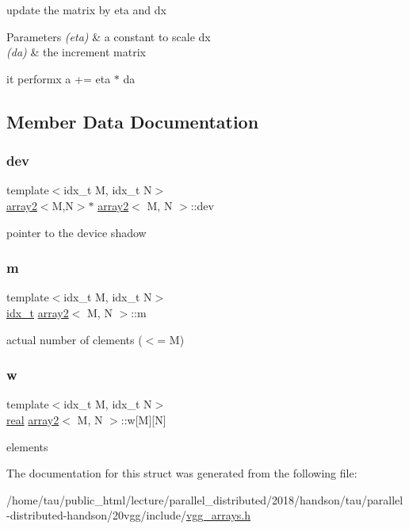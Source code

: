 update the matrix by eta and dx 


\begin{DoxyParams}{Parameters}
{\em (eta)} & a constant to scale dx \\
\hline
{\em (da)} & the increment matrix\\
\hline
\end{DoxyParams}
it performx a += eta $\ast$ da 

\subsection{Member Data Documentation}
\mbox{\label{structarray2_aedc7a89092267367178f4fcd4c9c3ead}} 
\subsubsection{\texorpdfstring{dev}{dev}}
{\footnotesize\ttfamily template$<$idx\+\_\+t M, idx\+\_\+t N$>$ \\
\hyperlink{structarray2}{array2}$<$M,N$>$$\ast$ \hyperlink{structarray2}{array2}$<$ M, N $>$\+::dev}

pointer to the device shadow \mbox{\label{structarray2_ae14313ec7a12d47e3654d69ca47391bd}} 
\subsubsection{\texorpdfstring{m}{m}}
{\footnotesize\ttfamily template$<$idx\+\_\+t M, idx\+\_\+t N$>$ \\
\hyperlink{vgg__util_8h_a8e93478a00e685bea5e6a3f617bf03a3}{idx\+\_\+t} \hyperlink{structarray2}{array2}$<$ M, N $>$\+::m}

actual number of clements ($<$= M) \mbox{\label{structarray2_aa68d1856f9eae6f8bd946367452501a6}} 
\subsubsection{\texorpdfstring{w}{w}}
{\footnotesize\ttfamily template$<$idx\+\_\+t M, idx\+\_\+t N$>$ \\
\hyperlink{vgg__util_8h_a1082d08aaa761215ec83e7149f27ad16}{real} \hyperlink{structarray2}{array2}$<$ M, N $>$\+::w\mbox{[}M\mbox{]}\mbox{[}N\mbox{]}}

elements 

The documentation for this struct was generated from the following file\+:\begin{DoxyCompactItemize}
\item 
/home/tau/public\+\_\+html/lecture/parallel\+\_\+distributed/2018/handson/tau/parallel-\/distributed-\/handson/20vgg/include/\hyperlink{vgg__arrays_8h}{vgg\+\_\+arrays.\+h}\end{DoxyCompactItemize}
